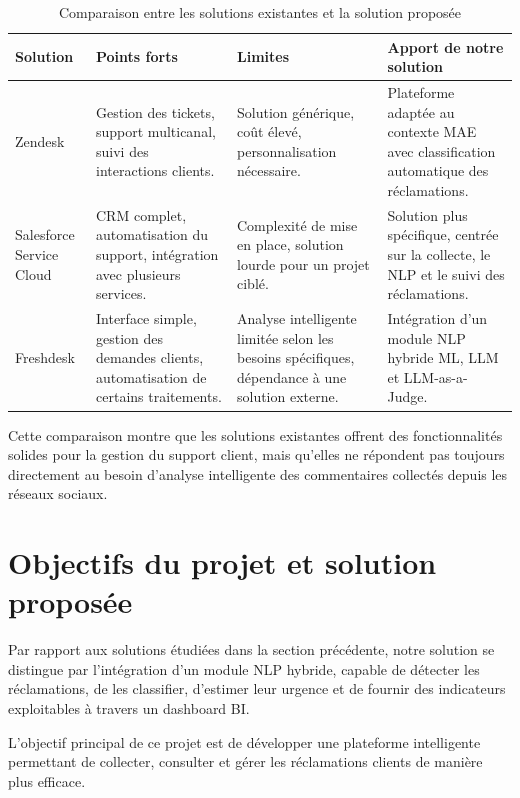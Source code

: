\documentclass[12pt,a4paper,oneside]{report}
\begin{document}
\begin{table}[H]
\centering
\footnotesize
\setlength{\tabcolsep}{4pt}
\renewcommand{\arraystretch}{1.05}
\caption{Comparaison entre les solutions existantes et la solution proposée}
\label{tab:comparaison-solutions}
\begin{tabular}{|p{3cm}|p{3.2cm}|p{3.2cm}|p{4cm}|}
\hline
\textbf{Solution} & \textbf{Points forts} & \textbf{Limites} & \textbf{Apport de notre solution} \\
\hline
Zendesk & Gestion des tickets, support multicanal, suivi des interactions clients. & Solution générique, coût élevé, personnalisation nécessaire. & Plateforme adaptée au contexte MAE avec classification automatique des réclamations. \\
\hline
Salesforce Service Cloud & CRM complet, automatisation du support, intégration avec plusieurs services. & Complexité de mise en place, solution lourde pour un projet ciblé. & Solution plus spécifique, centrée sur la collecte, le NLP et le suivi des réclamations. \\
\hline
Freshdesk & Interface simple, gestion des demandes clients, automatisation de certains traitements. & Analyse intelligente limitée selon les besoins spécifiques, dépendance à une solution externe. & Intégration d’un module NLP hybride ML, LLM et LLM-as-a-Judge. \\
\hline
\end{tabular}
\end{table}
\clearpage

Cette comparaison montre que les solutions existantes offrent des fonctionnalités solides pour la gestion du support client, mais qu’elles ne répondent pas toujours directement au besoin d’analyse intelligente des commentaires collectés depuis les réseaux sociaux.

\section{Objectifs du projet et solution proposée}
Par rapport aux solutions étudiées dans la section précédente, notre solution se distingue par l’intégration d’un module NLP hybride, capable de détecter les réclamations, de les classifier, d’estimer leur urgence et de fournir des indicateurs exploitables à travers un dashboard BI.

L’objectif principal de ce projet est de développer une plateforme intelligente permettant de collecter, consulter et gérer les réclamations clients de manière plus efficace.
\end{document}
